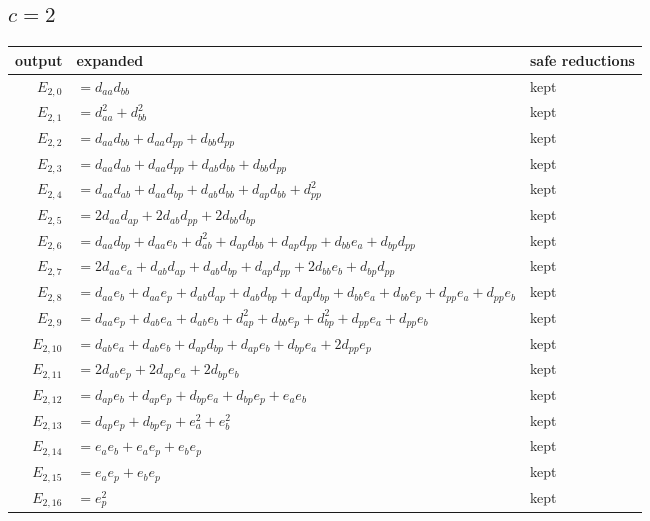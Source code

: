 \documentclass[10pt]{article}
\begin{document}
\subsection*{$c = 2$}
\begin{longtable}{r>{\raggedright\arraybackslash}p{}>{\raggedright\arraybackslash}p{}}
output & expanded & safe reductions \\ \hline
$E_{2,0}$ & $= d_{aa} d_{bb}$ & kept \\
$E_{2,1}$ & $= d_{aa}^{2} + d_{bb}^{2}$ & kept \\
$E_{2,2}$ & $= d_{aa} d_{bb} + d_{aa} d_{pp} + d_{bb} d_{pp}$ & kept \\
$E_{2,3}$ & $= d_{aa} d_{ab} + d_{aa} d_{pp} + d_{ab} d_{bb} + d_{bb} d_{pp}$ & kept \\
$E_{2,4}$ & $= d_{aa} d_{ab} + d_{aa} d_{bp} + d_{ab} d_{bb} + d_{ap} d_{bb} + d_{pp}^{2}$ & kept \\
$E_{2,5}$ & $= 2 d_{aa} d_{ap} + 2 d_{ab} d_{pp} + 2 d_{bb} d_{bp}$ & kept \\
$E_{2,6}$ & $= d_{aa} d_{bp} + d_{aa} e_{b} + d_{ab}^{2} + d_{ap} d_{bb} + d_{ap} d_{pp} + d_{bb} e_{a} + d_{bp} d_{pp}$ & kept \\
$E_{2,7}$ & $= 2 d_{aa} e_{a} + d_{ab} d_{ap} + d_{ab} d_{bp} + d_{ap} d_{pp} + 2 d_{bb} e_{b} + d_{bp} d_{pp}$ & kept \\
$E_{2,8}$ & $= d_{aa} e_{b} + d_{aa} e_{p} + d_{ab} d_{ap} + d_{ab} d_{bp} + d_{ap} d_{bp} + d_{bb} e_{a} + d_{bb} e_{p} + d_{pp} e_{a} + d_{pp} e_{b}$ & kept \\
$E_{2,9}$ & $= d_{aa} e_{p} + d_{ab} e_{a} + d_{ab} e_{b} + d_{ap}^{2} + d_{bb} e_{p} + d_{bp}^{2} + d_{pp} e_{a} + d_{pp} e_{b}$ & kept \\
$E_{2,10}$ & $= d_{ab} e_{a} + d_{ab} e_{b} + d_{ap} d_{bp} + d_{ap} e_{b} + d_{bp} e_{a} + 2 d_{pp} e_{p}$ & kept \\
$E_{2,11}$ & $= 2 d_{ab} e_{p} + 2 d_{ap} e_{a} + 2 d_{bp} e_{b}$ & kept \\
$E_{2,12}$ & $= d_{ap} e_{b} + d_{ap} e_{p} + d_{bp} e_{a} + d_{bp} e_{p} + e_{a} e_{b}$ & kept \\
$E_{2,13}$ & $= d_{ap} e_{p} + d_{bp} e_{p} + e_{a}^{2} + e_{b}^{2}$ & kept \\
$E_{2,14}$ & $= e_{a} e_{b} + e_{a} e_{p} + e_{b} e_{p}$ & kept \\
$E_{2,15}$ & $= e_{a} e_{p} + e_{b} e_{p}$ & kept \\
$E_{2,16}$ & $= e_{p}^{2}$ & kept \\
\end{longtable}
\end{document}
